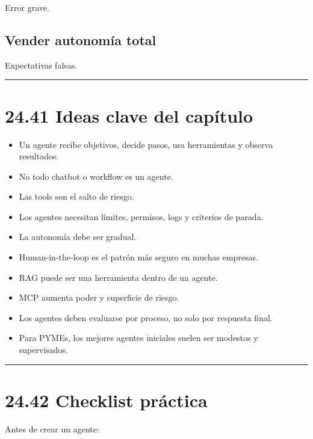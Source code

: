 Error grave.

\subsection{Vender autonomía total}\label{vender-autonomuxeda-total-1}

Expectativas falsas.

\begin{center}\rule{0.5\linewidth}{0.5pt}\end{center}

\section{24.41 Ideas clave del
capítulo}\label{ideas-clave-del-capuxedtulo-23}

\begin{itemize}
\tightlist
\item
  Un agente recibe objetivos, decide pasos, usa herramientas y observa
  resultados.
\item
  No todo chatbot o workflow es un agente.
\item
  Las tools son el salto de riesgo.
\item
  Los agentes necesitan límites, permisos, logs y criterios de parada.
\item
  La autonomía debe ser gradual.
\item
  Human-in-the-loop es el patrón más seguro en muchas empresas.
\item
  RAG puede ser una herramienta dentro de un agente.
\item
  MCP aumenta poder y superficie de riesgo.
\item
  Los agentes deben evaluarse por proceso, no solo por respuesta final.
\item
  Para PYMEs, los mejores agentes iniciales suelen ser modestos y
  supervisados.
\end{itemize}

\begin{center}\rule{0.5\linewidth}{0.5pt}\end{center}

\section{24.42 Checklist práctica}\label{checklist-pruxe1ctica-23}

Antes de crear un agente:

